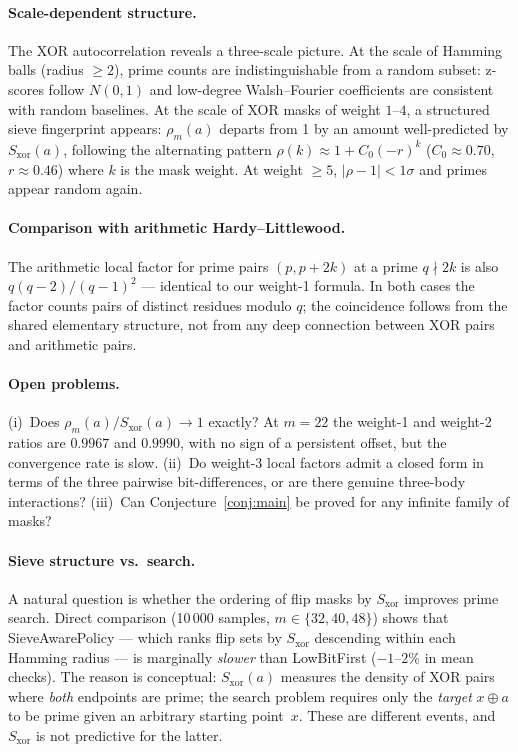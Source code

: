 \documentclass[11pt]{article}
\begin{document}
\paragraph{Scale-dependent structure.}
The XOR autocorrelation reveals a three-scale picture.
At the scale of Hamming balls (radius $\geq 2$),
prime counts are indistinguishable from a random subset:
z-scores follow $N(0,1)$ and low-degree Walsh--Fourier coefficients
are consistent with random baselines.
At the scale of XOR masks of weight $1$--$4$,
a structured sieve fingerprint appears: $\rho_m(a)$ departs from 1
by an amount well-predicted by $S_{\mathrm{xor}}(a)$,
following the alternating pattern
$\rho(k) \approx 1 + C_0(-r)^k$ ($C_0 \approx 0.70$, $r \approx 0.46$)
where $k$ is the mask weight.
At weight $\geq 5$, $|\rho - 1| < 1\sigma$ and primes appear random again.

\paragraph{Comparison with arithmetic Hardy--Littlewood.}
The arithmetic local factor for prime pairs $(p, p+2k)$ at a prime $q \nmid 2k$
is also $q(q-2)/(q-1)^2$ --- identical to our weight-1 formula.
In both cases the factor counts pairs of distinct residues modulo $q$;
the coincidence follows from the shared elementary structure,
not from any deep connection between XOR pairs and arithmetic pairs.

\paragraph{Open problems.}
(i)~Does $\rho_m(a)/S_{\mathrm{xor}}(a) \to 1$ exactly?
At $m=22$ the weight-1 and weight-2 ratios are $0.9967$ and $0.9990$,
with no sign of a persistent offset, but the convergence rate is slow.
(ii)~Do weight-3 local factors admit a closed form in terms of the
three pairwise bit-differences, or are there genuine three-body interactions?
(iii)~Can Conjecture~\ref{conj:main} be proved for any infinite family of masks?

\paragraph{Sieve structure vs.\ search.}
A natural question is whether the ordering of flip masks by $S_{\mathrm{xor}}$
improves prime search.
Direct comparison (10\,000 samples, $m \in \{32, 40, 48\}$) shows that
SieveAwarePolicy --- which ranks flip sets by $S_{\mathrm{xor}}$ descending
within each Hamming radius --- is marginally \emph{slower} than
LowBitFirst ($-1$--$2\%$ in mean checks).
The reason is conceptual: $S_{\mathrm{xor}}(a)$ measures the density of
XOR pairs where \emph{both} endpoints are prime; the search problem requires only
the \emph{target} $x \oplus a$ to be prime given an arbitrary starting point~$x$.
These are different events, and $S_{\mathrm{xor}}$ is not predictive for the latter.
\end{document}
